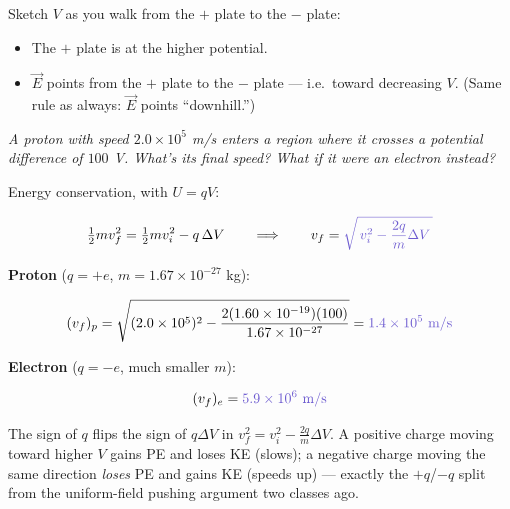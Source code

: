 \documentclass[12pt]{article}
\newcommand{\ANS}[1]{\textcolor{accent}{#1}}
\begin{document}
Sketch $V$ as you walk from the $+$ plate to the $-$ plate:

\begin{center}
\end{center}

\begin{itemize}[itemsep=6pt,parsep=3pt,topsep=3pt]
\item The \ANS{$+$} plate is at the higher potential.
\item $\vec E$ points from the $+$ plate to the $-$ plate --- i.e.\ toward
\ANS{decreasing} $V$. (Same rule as always: $\vec E$ points ``downhill.'')
\end{itemize}


\textit{A proton with speed $2.0\times10^5$ m/s enters a region where it
crosses a potential difference of $100$ V. What's its final speed? What if
it were an electron instead?}

Energy conservation, with $U=qV$:

\[
\tfrac12 m v_f^2 = \tfrac12 m v_i^2 - q\,\Delta V
\qquad\Longrightarrow\qquad
v_f = \ANS{\sqrt{\,v_i^2 - \dfrac{2q}{m}\Delta V\,}}
\]

\textbf{Proton} ($q=+e$, $m=1.67\times10^{-27}$ kg):

\[
(v_f)_p = \sqrt{(2.0\times10^5)^2 - \dfrac{2(1.60\times10^{-19})(100)}
{1.67\times10^{-27}}} = \ANS{1.4\times10^5\text{ m/s}}
\]

\textbf{Electron} ($q=-e$, much smaller $m$):

\[
(v_f)_e = \ANS{5.9\times10^6\text{ m/s}}
\]


{\small\color{accent} The sign of $q$ flips the sign of $q\Delta V$ in
$v_f^2=v_i^2-\tfrac{2q}{m}\Delta V$. A positive charge moving toward higher
$V$ gains PE and loses KE (slows); a negative charge moving the same
direction \emph{loses} PE and gains KE (speeds up) --- exactly the
$+q$/$-q$ split from the uniform-field pushing argument two classes ago.}
\end{document}

